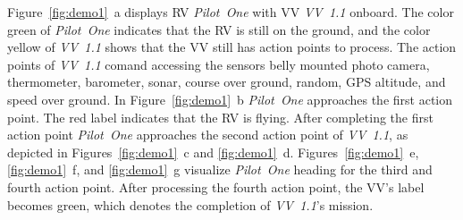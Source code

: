 Figure~\ref{fig:demo1}~a displays \ac{RV} \textit{Pilot~One} with \ac{VV} \textit{VV~1.1} onboard.
The color green of \textit{Pilot~One} indicates that the \ac{RV} is still on the ground, and the
color yellow of \textit{VV~1.1} shows that the \ac{VV} still has action points to process.
The action points of \textit{VV~1.1} comand accessing the sensors belly mounted photo camera, thermometer,
barometer, sonar, course over ground, random, GPS altitude, and speed over ground. 
In Figure~\ref{fig:demo1}~b \textit{Pilot~One} approaches the first action point. The red label indicates
that the \ac{RV} is flying. After completing the first action point \textit{Pilot~One} approaches the
second action point of \textit{VV~1.1}, as depicted in Figures~\ref{fig:demo1}~c and \ref{fig:demo1}~d.
Figures~\ref{fig:demo1}~e, \ref{fig:demo1}~f, and \ref{fig:demo1}~g visualize \textit{Pilot~One} heading
for the third and fourth action point. After processing the fourth action point, the \ac{VV}'s label
becomes green, which denotes the completion of \textit{VV~1.1}'s mission.


